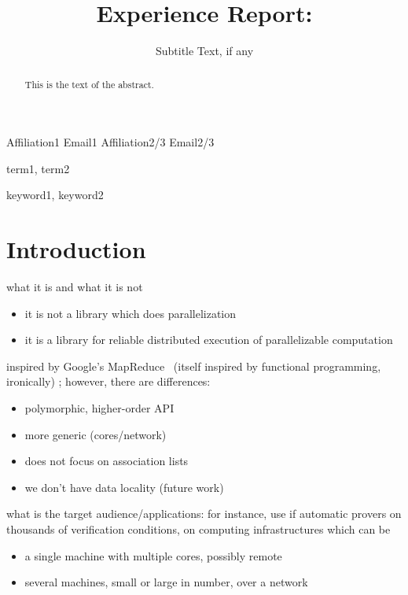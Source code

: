 \documentclass[preprint]{sigplanconf}
\begin{document}
\copyrightdata{[to be supplied]} 


\title{Experience Report: }
\subtitle{Subtitle Text, if any}

           {Affiliation1}
           {Email1}
           {Affiliation2/3}
           {Email2/3}

\maketitle

\begin{abstract}
This is the text of the abstract.
\end{abstract}


\terms
term1, term2

\keywords
keyword1, keyword2

\section{Introduction}

what it is and what it is not
\begin{itemize}
\item it is not a library which does parallelization
\item it is a library for reliable distributed execution of
  parallelizable computation 
\end{itemize}

inspired by Google's MapReduce~\cite{mapreduce} (itself inspired by functional
programming, ironically) ;  however, there are differences:
\begin{itemize}
\item polymorphic, higher-order API
\item more generic (cores/network)
\item does not focus on association lists
\item we don't have data locality (future work)
\end{itemize}

what is the target audience/applications: 
for instance, use if automatic provers on thousands of verification
conditions, on computing infrastructures which can be
\begin{itemize}
\item a single machine with multiple cores, possibly remote
\item several machines, small or large in number, over a network
\end{itemize}
\end{document}
